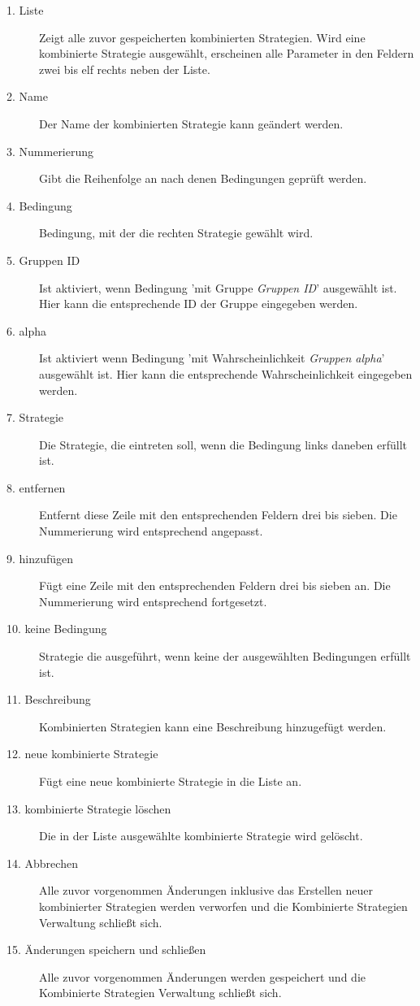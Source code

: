 \begin{description}

\item[1. Liste] Zeigt alle zuvor gespeicherten kombinierten Strategien. Wird eine kombinierte Strategie ausgewählt, erscheinen alle Parameter in den Feldern zwei bis elf rechts neben der Liste.

\item[2. Name] Der Name der kombinierten Strategie kann geändert werden.

\item[3. Nummerierung] Gibt die Reihenfolge an nach denen Bedingungen geprüft werden.

\item[4. Bedingung] Bedingung, mit der die rechten Strategie gewählt wird.

\item[5. Gruppen ID] Ist aktiviert, wenn Bedingung 'mit Gruppe \textit{Gruppen ID}' ausgewählt ist. Hier kann die entsprechende ID der Gruppe eingegeben werden.

\item[6. alpha] Ist aktiviert wenn Bedingung 'mit Wahrscheinlichkeit \textit{Gruppen alpha}' ausgewählt ist. Hier kann die entsprechende Wahrscheinlichkeit eingegeben werden.

\item[7. Strategie] Die Strategie, die eintreten soll, wenn die Bedingung links daneben erfüllt ist.

\item[8. entfernen] Entfernt diese Zeile mit den entsprechenden Feldern drei bis sieben. Die Nummerierung wird entsprechend angepasst.

\item[9. hinzufügen] Fügt eine Zeile mit den entsprechenden Feldern drei bis sieben an. Die Nummerierung wird entsprechend fortgesetzt.

\item[10. keine Bedingung] Strategie die ausgeführt, wenn keine der ausgewählten Bedingungen erfüllt ist.

\item[11. Beschreibung] Kombinierten Strategien kann eine Beschreibung hinzugefügt werden.

\item[12. neue kombinierte Strategie] Fügt eine neue kombinierte Strategie in die Liste an. 

\item[13. kombinierte Strategie löschen] Die in der Liste ausgewählte kombinierte Strategie wird gelöscht.

\item[14. Abbrechen] Alle zuvor vorgenommen Änderungen inklusive das Erstellen neuer kombinierter Strategien werden verworfen und die Kombinierte Strategien Verwaltung schließt sich. 

\item[15. Änderungen speichern und schließen] Alle zuvor vorgenommen Änderungen werden gespeichert und die Kombinierte Strategien Verwaltung schließt sich.

\end{description}

